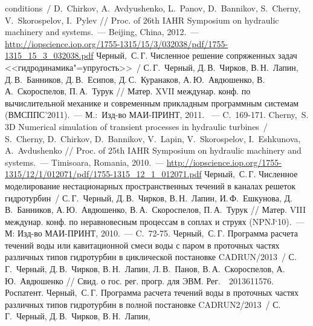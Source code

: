 \begin{thebibliography}{999}
              conditions~/ D.~Chirkov, A.~Avdyushenko, L.~Panov, D.~Bannikov, S.~Cherny, V.~Skorospelov, 
              I.~Pylev // Proc. of 26th IAHR Symposium on hydraulic machinery and systems.~--- 
              Beijing, China, 2012.~---
              \href{http://iopscience.iop.org/1755-1315/15/3/032038/pdf/1755-1315_15_3_032038.pdf}
              {http://iopscience.iop.org/1755-1315/15/3/032038/pdf/1755-1315\_15\_3\_032038.pdf}
\Rus
{} Черный,~С.\,Г. Численное решение сопряженных задач <<гидродинамика"=упругость>>~/ 
              С.\,Г.~Черный, Д.\,В.~Чирков, В.\,Н.~Лапин, Д.\,В.~Банников, Д.\,В.~Есипов, Д.\,С.~Куранаков, 
              А.\,Ю.~Авдюшенко, В.\,А.~Скороспелов, П.\,А.~Турук // 
              Матер. XVII междунар. конф. по вычислительной механике и современным прикладным 
              программным системам (ВМСППС’2011).~--- М.:~Изд-во МАИ-ПРИНТ, 
              2011. ~--- C.~169-171.
\Eng
{} Cherny,~S. 3D Numerical simulation of transient processes in hydraulic 
               turbines~/ S.~Cherny, D.~Chirkov, D.~Bannikov, V.~Lapin, V.~Skorospelov, 
               I.~Eshkunova, A.~Avdushenko // Proc. of 25th IAHR Symposium on hydraulic machinery and 
               systems.~--- Timisoara, Romania, 2010.~--- 
               \href{http://iopscience.iop.org/1755-1315/12/1/012071/pdf/1755-1315_12_1_012071.pdf}
               {http://iopscience.iop.org/1755-1315/12/1/012071/pdf/1755-1315\_12\_1\_012071.pdf} 
\Rus
{} Черный,~С.\,Г. Численное моделирование нестационарных пространственных течений в 
               каналах решеток гидротурбин~/ С.\,Г.~Черный, Д.\,В.~Чирков, В.\,Н.~Лапин, И.\,Ф.~Ешкунова, 
               Д.\,В.~Банников, А.\,Ю.~Авдюшенко, В.\,А.~Скороспелов, П.\,А.~Турук // Матер. VIII 
               междунар. конф. по неравновесным процессам в соплах и струях (NPNJ`10).~--- М: Изд-во МАИ-ПРИНТ, 2010.~--- C.~72-75.
\Rus
{} Черный,~С.\,Г. Программа расчета течений воды или кавитационной смеси воды с паром в проточных 
               частях различных типов гидротурбин в циклической постановке CADRUN/2013~/ С.\,Г.~Черный, 
               Д.\,В.~Чирков, В.\,Н.~Лапин, Л.\,В.~Панов, В.\,А.~Скороспелов, А.\,Ю.~Авдюшенко // 
               Свид. о гос. рег. прогр. для ЭВМ. Рег.~\No~2013611576. Роспатент.
\Rus
{} Черный,~С.\,Г. Программа расчета течений воды в проточных частях различных типов 
               гидротурбин в полной постановке CADRUN2/2013~/ С.\,Г.~Черный, Д.\,В.~Чирков, В.\,Н.~Лапин, 

\end{thebibliography}

